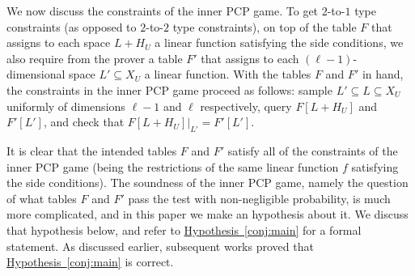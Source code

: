 \documentclass[11pt]{article}
\numberwithin{equation}{section}
\theoremstyle{definition}
\theoremstyle{plain}
\newcommand{\expref}[2]{\hyperref[#2]{#1~\ref{#2}}}
\renewcommand\subset{\subseteq}
\begin{document}
We now discuss the constraints of the inner PCP game. To get $2$-to-$1$ type constraints (as opposed to $2$-to-$2$ type constraints), on top
of the table $F$ that assigns to each space $L+H_U$ a linear function satisfying the side conditions, we also require from the prover a table
$F'$ that assigns to each $(\ell-1)$-dimensional space $L'\subseteq X_U$ a linear function. With the tables $F$ and $F'$ in hand, the constraints
in the inner PCP game proceed as follows: sample $L'\subset L\subseteq X_U$ uniformly of dimensions $\ell-1$ and $\ell$ respectively, query
$F[L + H_U]$ and $F'[L']$, and check that $F[L+H_U]|_{L'} = F'[L']$.

It is clear that the intended tables $F$ and $F'$ satisfy all of the
constraints of the inner PCP game (being the restrictions of the same linear function $f$ satisfying the side conditions).
The soundness of the inner PCP game, namely the question of what tables $F$ and $F'$ pass the test with non-negligible probability,
is much more complicated, and in this paper we make an hypothesis about it. We discuss that hypothesis below, and refer to \expref{Hypothesis}{conj:main} for a formal statement. As discussed earlier, subsequent works proved that \expref{Hypothesis}{conj:main}
is correct.
\end{document}
